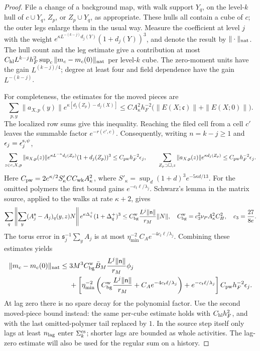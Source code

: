 \documentclass[11pt,letterpaper,reqno]{amsart}
\theoremstyle{definition}
\theoremstyle{remark}
\begin{document}
\begin{proof}
File a change of a background map, with walk support $Y_q$,
on the level-$k$ hull of $c\cup Y_q$, $Z_p$, or
$Z_p\cup Y_q$, as appropriate. These hulls all contain a cube
of $c$; the outer legs enlarge them in the usual way. Measure
the coefficient at level $j$ with the weight
$e^{\kappa L^{-(k-j)}d_j(Y)}(1+d_j(Y))^3$, and denote the
result by $\|\cdot\|_{\rm nat}$. The hull count and the leg
estimate give a contribution at most
$C_{\rm hl}L^{k-j}h_F^2\sup_c\|m_c-m_c(0)\|_{\rm nat}$
per level-$k$ cube. The zero-moment units have the gain
$L^{(k-j)/4}$; degree at least four and field dependence
have the gain $L^{-(k-j)}$.

For completeness, the estimates for the moved pieces are
\[
 \sum_{p,y}\|a_{X,p}(y)\|
       e^{\kappa[d_j(Z_p)-d_j(X)]}
 \le C A_\kappa^2h_F^{-2}
              \bigl(\|E(X;\mathfrak c)\|+\|E(X;0)\|\bigr).
\]
The localized row sums give this inequality. Reaching the filed
cell from a cell $c'$ leaves the summable factor $e^{-r(c',c)}$.
Consequently, writing $n=k-j\ge1$ and
$\epsilon_j=\epsilon_j^{{\rm s},\psi}$,
\[
 \sum_{z\in c,X,p}\|a_{X,p}(z)\|
       e^{\kappa L^{-n}d_j(Z_p)}(1+d_j(Z_p))^3
       \le C_{\rm pw}h_F^{-2}\epsilon_j,
 \qquad
 \sum_{Z_p\supset\square,z}\|a_{X,p}(z)\|
       e^{\kappa d_j(Z_p)}\le C_{\rm pw}h_F^{-2}\epsilon_j.
\]
Here
$C_{\rm pw}=2e^{\kappa/2}S'_\kappa C C_{\rm wk}A_\kappa^2$,
where $S'_\kappa=\sup_d(1+d)^3e^{-5\kappa d/13}$.
For the omitted polymers the first bound gains
$e^{-c_t\ell/\lambda_j}$. Schwarz's lemma in the matrix source,
applied to the walks at rate $\kappa+2$, gives
\[
 \sum_q\left\|\sum_y(A_j^{\mathsf n}-A_j)_q(y,z)N\right\|
       e^{\kappa\Delta_q^+}(1+\Delta_q^+)^3
 \le C_{\rm bg}^{\rm w}\frac{L^j\|\mathsf n\|}{r_M}\|N\|,
 \quad
 C_{\rm bg}^{\rm w}=c_3^2\nu_PA_\kappa^2C_H^2,
 \quad c_3=\frac{27}{8e}.
\]
The torus error in $\mathfrak s_j^{-1}\sum_y A_j$ is at most
$\eta_{\min}^{-2}C_Ae^{-4c_t\ell/\lambda_j}$. Combining these
estimates yields
\[
\begin{split}
 \|m_c-m_c(0)\|_{\rm nat}\le{}&
 3M^3 C_{\rm bg}^{\rm w}\bar B_M
                  \frac{L^j\|\mathsf n\|}{r_M}\phi_j\\
 &+\left[\eta_{\min}^{-2}
       \left(C_{\rm bg}^{\rm w}\frac{L^j\|\mathsf n\|}{r_M}
                    +C_Ae^{-4c_t\ell/\lambda_j}\right)
                    +e^{-c_t\ell/\lambda_j}\right]
                         C_{\rm pw}h_F^{-2}\epsilon_j.
\end{split}
\]
At lag zero there is no spare decay for the polynomial factor.
Use the second moved-piece bound instead: the same per-cube
estimate holds with $C_{\rm hl}h_F^2$, and with the last
omitted-polymer tail replaced by $1$. In the source step itself
only lags at least $n_{\rm lag}$ enter $\Sigma_k^{\rm cs}$;
shorter lags are bounded as whole activities. The lag-zero
estimate will also be used for the regular sum on a history.


\end{proof}
\end{document}
